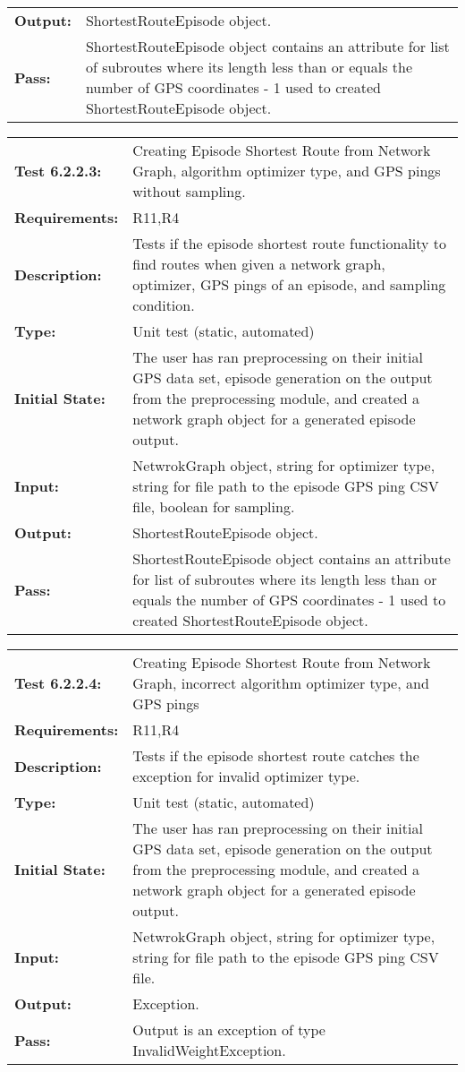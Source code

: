 \documentclass[12pt, titlepage]{article}
\begin{document}
{\begin{tabular}{|l|p{10cm}|}
    \bf{Output}: & ShortestRouteEpisode object. \\
    \bf{Pass}: & ShortestRouteEpisode object contains an attribute for list of subroutes where its length less than or equals the number of GPS coordinates - 1 used to created ShortestRouteEpisode object. \\
    \hline
\end{tabular}
\begin{tabular}{|l|p{10cm}|}
    \hline
    \bf{Test} 6.2.2.3: & Creating Episode Shortest Route from Network Graph, algorithm optimizer type, and GPS pings without sampling. \\
    \bf{Requirements}: & R11,R4 \\
    \bf{Description}: & Tests if the episode shortest route functionality to find routes when given a network graph, optimizer, GPS pings of an episode, and sampling condition. \\
    \bf{Type}: & Unit test (static, automated) \\
    \bf{Initial State}: & The user has ran preprocessing on their initial GPS data set, episode generation on the output from the preprocessing module, and created a network graph object for a generated episode output. \\
    \bf{Input}: & NetwrokGraph object, string for optimizer type, string for file path to the episode GPS ping CSV file, boolean for sampling. \\
    \bf{Output}: & ShortestRouteEpisode object. \\
    \bf{Pass}: & ShortestRouteEpisode object contains an attribute for list of subroutes where its length less than or equals the number of GPS coordinates - 1 used to created ShortestRouteEpisode object. \\
    \hline
\end{tabular}
\begin{tabular}{|l|p{10cm}|}
    \hline
    \bf{Test} 6.2.2.4: & Creating Episode Shortest Route from Network Graph, incorrect algorithm optimizer type, and GPS pings \\
    \bf{Requirements}: &  R11,R4\\
    \bf{Description}: & Tests if the episode shortest route catches the exception for invalid optimizer type. \\
    \bf{Type}: & Unit test (static, automated) \\
    \bf{Initial State}: & The user has ran preprocessing on their initial GPS data set, episode generation on the output from the preprocessing module, and created a network graph object for a generated episode output. \\
    \bf{Input}: & NetwrokGraph object, string for optimizer type, string for file path to the episode GPS ping CSV file. \\
    \bf{Output}: & Exception. \\
    \bf{Pass}: & Output is an exception of type InvalidWeightException. \\
    \hline
\end{tabular}
}
\end{document}
